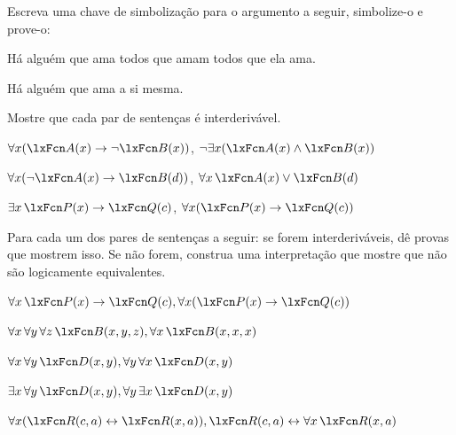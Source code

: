 \solutions
\problempart
\label{pr.likes}
Escreva uma chave de simbolização para o argumento a seguir, simbolize-o e prove-o:
\begin{earg}
\item Há alguém que ama todos que amam todos que ela
ama.
\item[\texttherefore] Há alguém que ama a si mesma.
\end{earg}


\problempart
Mostre que cada par de sentenças é interderivável.
\begin{compactlist}
\item $\forall x (\atom{A}{x}\eif \enot \atom{B}{x})$, $\enot\exists x(\atom{A}{x} \eand \atom{B}{x})$
\item $\forall x (\enot\atom{A}{x}\eif \atom{B}{d})$, $\forall x\,\atom{A}{x} \eor \atom{B}{d}$
\item $\exists x\,\atom{P}{x} \eif \atom{Q}{c}$, $\forall x (\atom{P}{x} \eif \atom{Q}{c})$
\end{compactlist}

\solutions
\problempart
\label{pr.FOLequivornot}
Para cada um dos pares de sentenças a seguir: se forem interderiváveis, dê provas que mostrem isso. Se não forem, construa uma interpretação que mostre que não são logicamente equivalentes.
\begin{compactlist}
\item $\forall x\,\atom{P}{x} \eif \atom{Q}{c}, \forall x (\atom{P}{x} \eif \atom{Q}{c})$
\item $\forall x\,\forall y\, \forall z\,\atom{B}{x,y,z}, \forall x\,\atom{B}{x,x,x}$
\item $\forall x\,\forall y\,\atom{D}{x,y}, \forall y\,\forall x\,\atom{D}{x,y}$
\item $\exists x\,\forall y\,\atom{D}{x,y}, \forall y\,\exists x\,\atom{D}{x,y}$
\item $\forall x (\atom{R}{c,a} \eiff \atom{R}{x,a}), \atom{R}{c,a} \eiff \forall x\,\atom{R}{x,a}$
\end{compactlist}

